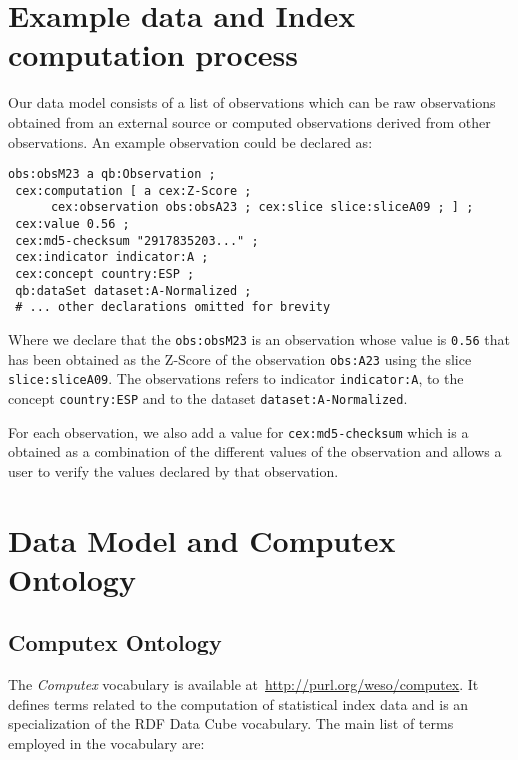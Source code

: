 \section{Example data and Index computation process}

Our data model consists of a list of observations which can be raw observations
obtained from an external source or computed observations derived from other
observations. An example observation could be declared as:

\begin{lstlisting}[style=SPARQL]
obs:obsM23 a qb:Observation ;
 cex:computation [ a cex:Z-Score ; 
      cex:observation obs:obsA23 ; cex:slice slice:sliceA09 ; ] ;
 cex:value 0.56 ;
 cex:md5-checksum "2917835203..." ;
 cex:indicator indicator:A ;
 cex:concept country:ESP ;
 qb:dataSet dataset:A-Normalized ;
 # ... other declarations omitted for brevity
\end{lstlisting}

Where we declare that the \lstinline|obs:obsM23| is an observation
 whose value is \lstinline|0.56| that has been obtained as the Z-Score
 of the observation \lstinline|obs:A23| using the slice
 \lstinline|slice:sliceA09|. The observations refers to indicator
 \lstinline|indicator:A|, to the concept \lstinline|country:ESP| and to the
 dataset \lstinline|dataset:A-Normalized|.
 
For each observation, we also add a value for 
\lstinline|cex:md5-checksum| which is a obtained as a combination of the 
different values of the observation and allows a user to verify the
values declared by that observation.


\section{Data Model and Computex Ontology}

\subsection{Computex Ontology}
The \emph{Computex} vocabulary is available
at~\url{http://purl.org/weso/computex}. It defines terms related to the
computation of statistical index data and is an specialization of
the RDF Data Cube vocabulary. The main list of terms employed in the vocabulary
are:

